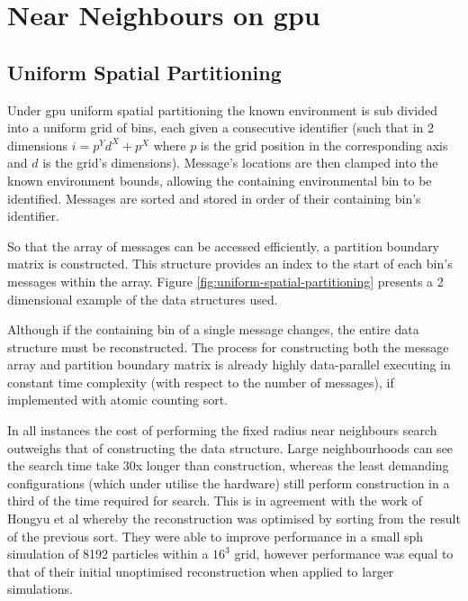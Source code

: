 \section{Near Neighbours on \gls{gpu}\label{sec:spatial-partitioning}}


\subsection{Uniform Spatial Partitioning}
Under \gls{gpu} uniform spatial partitioning the known environment is sub divided into a uniform grid of bins, each given a consecutive identifier (such that in 2 dimensions $i = p^{Y}d^{X}+p^{X}$ where $p$ is the grid position in the corresponding axis and $d$ is the grid's dimensions). Message's locations are then clamped into the known environment bounds, allowing the containing environmental bin to be identified. Messages are sorted and stored in order of their containing bin's identifier.

So that the array of messages can be accessed efficiently, a partition boundary matrix is constructed. This structure provides an index to the start of each bin's messages within the array. Figure \ref{fig:uniform-spatial-partitioning} presents a 2 dimensional example of the data structures used.

Although if the containing bin of a single message changes, the entire data structure must be reconstructed. The process for constructing both the message array and partition boundary matrix is already highly data-parallel executing in constant time complexity (with respect to the number of messages), if implemented with atomic counting sort.

In all instances the cost of performing the fixed radius near neighbours search outweighs that of constructing the data structure. Large neighbourhoods can see the search time take 30x longer than construction, whereas the least demanding configurations (which under utilise the hardware) still perform construction in a third of the time required for search. This is in agreement with the work of Hongyu et al whereby the reconstruction was optimised by sorting from the result of the previous sort\cite{HY*15}. They were able to improve performance in a small \gls{sph} simulation of 8192 particles within a $16^{3}$ grid, however performance was equal to that of their initial unoptimised reconstruction when applied to larger simulations.

